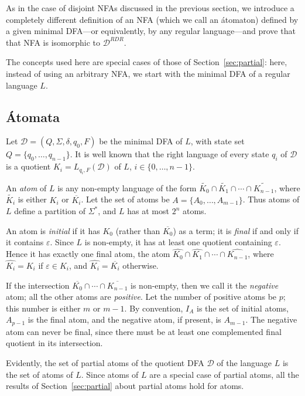 \documentclass[preprint,12pt]{elsarticle}
\newcommand{\ol}{\overline}
\newcommand{\eps}{\varepsilon}
\newcommand{\Sig}{\Sigma}
\newcommand{\cD}{{\mathcal D}}
\begin{document}
As in the case of disjoint NFAs discussed in the previous section, we introduce a completely different definition of an NFA (which we call an \'atomaton) defined by a given minimal DFA---or equivalently, by any regular language---and prove that that NFA is isomorphic to $\cD^{RDR}$.


The concepts used here are special cases of those of Section~\ref{sec:partial}: 
here, instead of using an arbitrary NFA, we start with the minimal DFA of a regular language $L$.

\subsection{\'Atomata}

Let $\cD=(Q, \Sig, \delta, q_0,F)$ be the minimal DFA of $L$, with
state set $Q=\{q_0,\ldots,q_{n-1}\}$.
It is well known that the right language of every state $q_i$ of $\cD$ 
is a quotient $K_i=L_{q_i,F}(\cD)$ of $L$, $i\in\{0,\ldots,n-1\}$. 


An \emph{atom} of $L$ is any non-empty language of the form 
$\widetilde{K_0}\cap\widetilde{K_1}\cap \cdots \cap \widetilde{K_{n-1}}$, 
where $\widetilde{K_i}$ is either $K_i$ or $\ol{K_i}$. 
Let the set of atoms be $A=\{A_0,\ldots,A_{m-1}\}$. 
Thus atoms of $L$ define a partition of $\Sig^*$, and 
$L$ has at most $2^n$ atoms.

An atom is \emph{initial} if it has $K_0$ (rather than $\ol{K_0}$) as a term;
it is \emph{final} if and only if it contains $\eps$.
Since $L$ is non-empty, it has at least one quotient containing $\eps$. 
Hence it has exactly one final atom, the atom 
$\widehat{K_0}\cap\widehat{K_1}\cap \cdots \cap \widehat{K_{n-1}}$, where 
$\widehat{K_i}=K_i$ if $\eps\in K_i$, and $\widehat{K_i}=\ol{K_i}$ otherwise.

If the intersection 
$\ol{K_0}\cap \cdots \cap \ol{K_{n-1}}$ is non-empty, then we call it 
the \emph{negative} atom; all the other atoms are \emph{positive}. 
Let the number of positive atoms be $p$; this number is either $m$ or $m-1$.
By convention, $I_A$ is the set of initial atoms, $A_{p-1}$ is the final atom, 
and the negative atom, if present, is $A_{m-1}$.
The negative atom can never be final, 
since there must be at least one complemented final quotient in its intersection.


Evidently, the set of partial atoms of the quotient DFA $\cD$ of the language $L$ is 
the set of atoms of $L$.
Since atoms of $L$ are a special case of partial atoms, all the results of 
Section~\ref{sec:partial} about partial atoms hold for atoms.
\end{document}
